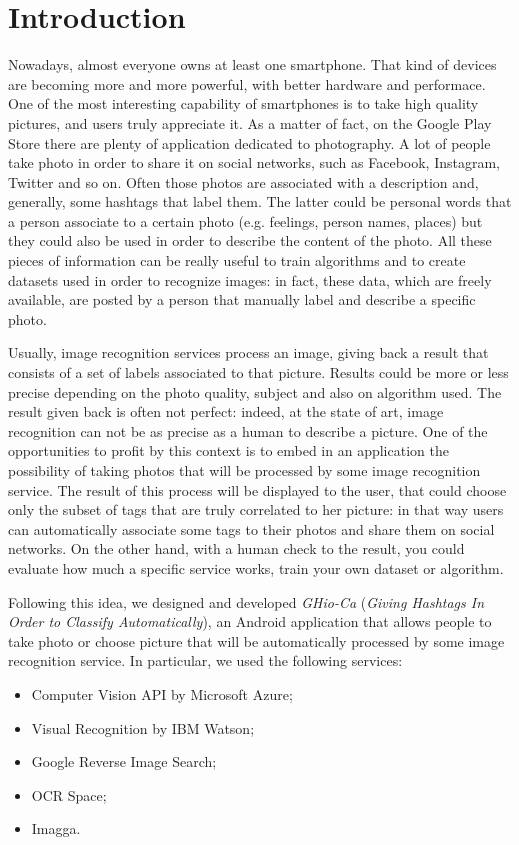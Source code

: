 \section{Introduction}
\label{sec:introduction}

Nowadays, almost everyone owns at least one smartphone. That kind of devices are 
becoming more and more powerful, with better hardware and performace. One of the 
most interesting capability of smartphones is to take high quality pictures, and 
users truly appreciate it. As a matter of fact, on the Google Play Store there 
are plenty of application dedicated to photography.
A lot of people take photo in order to share it on social networks, such as 
Facebook, Instagram, Twitter and so on. Often those photos are associated with a 
description and, generally, some hashtags that label them. The latter could be 
personal words that a person associate to a certain photo (e.g. feelings, person 
names, places) but they could also be used in order to describe the content of 
the photo.
All these pieces of information can be really useful to train algorithms and to 
create datasets used in order to recognize images: in fact, these data, which 
are freely available, are posted by a person that manually label and describe a 
specific photo.

Usually, image recognition services process an image, giving back a result that 
consists of a set of labels associated to that picture. Results could be more or 
less precise depending on the photo quality, subject and also on algorithm used. 
The result given back is often not perfect: indeed, at the state of art, image 
recognition can not be as precise as a human to describe a picture.
One of the opportunities to profit by this context is to embed in an application 
the possibility of taking photos that will be processed by some image 
recognition service. The result of this process will be displayed to the user, 
that could choose only the subset of tags that are truly correlated to her 
picture: in that way users can automatically associate some tags to their photos 
and share them on social networks. On the other hand, with a human check to the 
result, you could evaluate how much a specific service works, train your own 
dataset or algorithm.

Following this idea, we designed and developed \textit{GHio-Ca} (\textit{Giving 
Hashtags In Order to Classify Automatically}), an Android application that 
allows people to take photo or choose picture that will be automatically 
processed by some image recognition service. In particular, we used the 
following services:
\begin{itemize}
  \item Computer Vision API by Microsoft Azure\cite{Microsoft};
  \item Visual Recognition by IBM Watson\cite{IBM};
  \item Google Reverse Image Search\cite{Google};
  \item OCR Space\cite{OCR};
  \item Imagga\cite{Imagga}.
\end{itemize}

